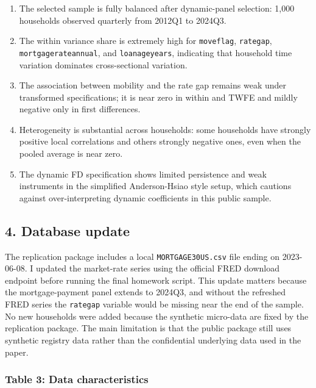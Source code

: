 \documentclass[a4paper,11pt]{article}
\renewcommand{\_}{\textunderscore\allowbreak}
\providecommand{\tightlist}{%
  \setlength{\itemsep}{0pt}\setlength{\parskip}{0pt}}
\begin{document}
\begin{enumerate}
\def\labelenumi{\arabic{enumi}.}
\tightlist
\item
  The selected sample is fully balanced after dynamic-panel selection:
  1,000 households observed quarterly from 2012Q1 to 2024Q3.
\item
  The within variance share is extremely high for \texttt{move\_flag},
  \texttt{rate\_gap}, \texttt{mortgage\_rate\_annual}, and
  \texttt{loan\_age\_years}, indicating that household time variation
  dominates cross-sectional variation.
\item
  The association between mobility and the rate gap remains weak under
  transformed specifications; it is near zero in within and TWFE and
  mildly negative only in first differences.
\item
  Heterogeneity is substantial across households: some households have
  strongly positive local correlations and others strongly negative
  ones, even when the pooled average is near zero.
\item
  The dynamic FD specification shows limited persistence and weak
  instruments in the simplified Anderson-Hsiao style setup, which
  cautions against over-interpreting dynamic coefficients in this public
  sample.
\end{enumerate}

\hypertarget{database-update}{%
\subsection{4. Database update}\label{database-update}}

The replication package includes a local \texttt{MORTGAGE30US.csv} file
ending on 2023-06-08. I updated the market-rate series using the
official FRED download endpoint before running the final homework
script. This update matters because the mortgage-payment panel extends
to 2024Q3, and without the refreshed FRED series the \texttt{rate\_gap}
variable would be missing near the end of the sample. No new households
were added because the synthetic micro-data are fixed by the replication
package. The main limitation is that the public package still uses
synthetic registry data rather than the confidential underlying data
used in the paper.

\hypertarget{table-3-data-characteristics}{%
\subsubsection{Table 3: Data
characteristics}\label{table-3-data-characteristics}}
\end{document}
